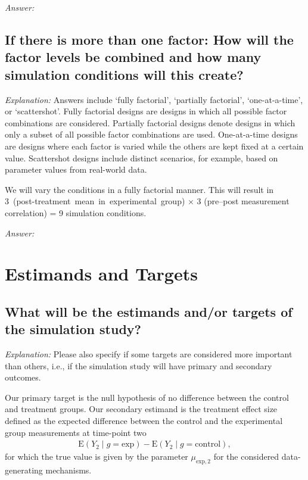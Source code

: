 \documentclass[12pt]{article}
\begin{document}
\textit{Answer:}

\subsection{If there is more than one factor: How will the factor levels be combined and how many simulation conditions will this create?}

\textit{Explanation:}  Answers include `fully factorial', `partially factorial', `one-at-a-time', or `scattershot'. Fully factorial designs are designs in which all possible factor combinations are considered. Partially factorial designs denote designs in which only a subset of all possible factor combinations are used. One-at-a-time designs are designs where each factor is varied while the others are kept fixed at a certain value. Scattershot designs include distinct scenarios, for example, based on parameter values from real-world data.

\begin{examplebox}
We will vary the conditions in a fully factorial manner. This will result in \mbox{3 (post-treatment mean in experimental group)} $\times$ 3 (pre--post measurement correlation) = 9 simulation conditions.
\end{examplebox}

\textit{Answer:}


\section{Estimands and Targets}
\subsection{What will be the estimands and/or targets of the simulation study?}

\textit{Explanation:} Please also specify if some targets are considered more important than others, i.e., if the simulation study will have primary and secondary outcomes.

\begin{examplebox}
Our primary target is the null hypothesis of no difference between the control and treatment groups. Our secondary estimand is the treatment effect size defined as the expected difference between the control and the experimental group measurements at time-point two
\begin{align*}
    \text{E}(Y_2 \mid g=\text{exp}) - \text{E}(Y_2 \mid g=\text{control}),
\end{align*}
for which the true value is given by the parameter $\mu_{\text{exp},2}$ for the considered data-generating mechanisms.
\end{examplebox}
\end{document}
